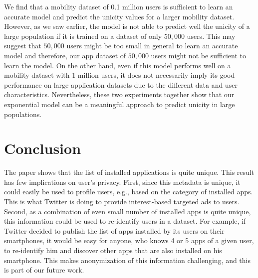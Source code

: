\documentclass{acm_proc_article-sp}
\theoremstyle{plain}
\theoremstyle{plain}
\theoremstyle{plain}
\theoremstyle{plain}
\theoremstyle{plain}
\theoremstyle{plain}
\begin{document}
We find that a mobility dataset of 0.1 million users is sufficient to learn an accurate model and predict the unicity values for a larger mobility dataset.
However, as we saw earlier, the model is not able to predict well the unicity of a large population if it is trained on a dataset of only $50,000$ users.
This may suggest that $50,000$ users might be too small in general to learn an accurate model and therefore, our app dataset of $50,000$ users might not be sufficient to learn the model.
On the other hand, even if this model performs well on a mobility dataset with 1 million users, it does not necessarily imply its good performance on large application datasets due to the different data and user characteristics.
Nevertheless, these two experiments together show that our exponential model can be a meaningful approach to predict unicity in large populations.






    










    





































\section{Conclusion}
The paper shows that the list of installed applications is quite unique.
This result has few implications on user's privacy. 
First, since this metadata is unique, it could easily be used to profile users, e.g., based on the category of installed apps. 
This is what Twitter is doing to provide interest-based targeted ads to users.
Second, as a combination of even small number of installed apps is quite unique, this information could be used to re-identify users in a dataset. 
For example, if Twitter decided to publish the list of apps installed by its users on their smartphones, it would be easy for anyone, who knows 4 or 5 apps of a given user, to re-identify him and discover other apps that are also installed on his smartphone. 
This makes anonymization of this information challenging, and this is part of our future work.
\end{document}

